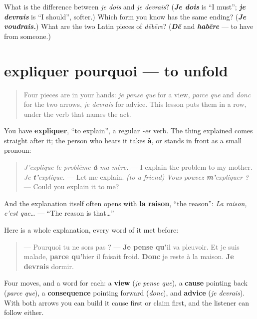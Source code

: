 \begin{tcolorbox}[breakable,colback=teal!4,colframe=teal!35!black,title={Before you move on}]
What is the difference between \emph{je dois} and \emph{je devrais}? (\emph{\textbf{Je dois}} is \textquotedblleft{}I must\textquotedblright{}; \emph{\textbf{je devrais}} is \textquotedblleft{}I should\textquotedblright{}, softer.) Which form you know has the same ending? (\emph{\textbf{Je voudrais.}}) What are the two Latin pieces of \emph{dēbēre}? (\emph{\textbf{Dē}} and \emph{\textbf{habēre}} — to have from someone.)
\end{tcolorbox}
\section[expliquer pourquoi]{expliquer pourquoi — to unfold}

\label{lesson:FR-C261-expliquer}



\begin{quote}
Four pieces are in your hands: \emph{je pense que} for a view, \emph{parce que} and \emph{donc} for the two arrows, \emph{je devrais} for advice. This lesson puts them in a row, under the verb that names the act.
\end{quote}

\begin{grammarlens}[title={Grammar Lens: explaining something to someone}]
You have \textbf{expliquer}, \textquotedblleft{}to explain\textquotedblright{}, a regular \emph{-er} verb. The thing explained comes straight after it; the person who hears it takes \textbf{à}, or stands in front as a small pronoun:

\begin{quote}
\emph{J'explique le problème \textbf{à} ma mère.} — I explain the problem to my mother. \emph{Je \textbf{t'}explique.} — Let me explain. \emph{(to a friend)} \emph{Vous pouvez \textbf{m'}expliquer ?} — Could you explain it to me?
\end{quote}

And the explanation itself often opens with \textbf{la raison}, \textquotedblleft{}the reason\textquotedblright{}: \emph{La raison, c'est que…} — \textquotedblleft{}The reason is that…\textquotedblright{}
\end{grammarlens}

\begin{grammarlens}[title={Grammar Lens: the shape of an explanation}]
Here is a whole explanation, every word of it met before:

\begin{quote}
— Pourquoi tu ne sors pas ? — \textbf{Je pense qu'}il va pleuvoir. Et je suis malade, \textbf{parce qu'}hier il faisait froid. \textbf{Donc} je reste à la maison. \textbf{Je devrais} dormir.
\end{quote}

Four moves, and a word for each: a \textbf{view} (\emph{je pense que}), a \textbf{cause} pointing back (\emph{parce que}), a \textbf{consequence} pointing forward (\emph{donc}), and \textbf{advice} (\emph{je devrais}). With both arrows you can build it cause first or claim first, and the listener can follow either.
\end{grammarlens}

